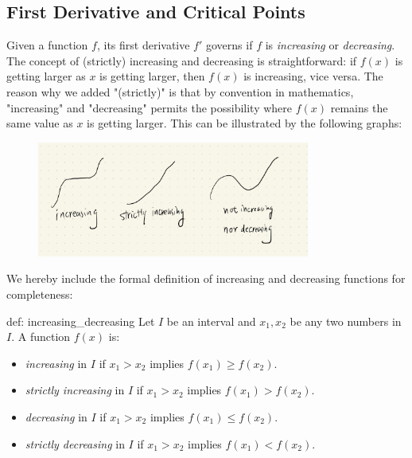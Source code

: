 \subsection{First Derivative and Critical Points}

Given a function $f$, its first derivative $f'$ governs if $f$ is \textit{increasing} or \textit{decreasing}.  The concept of (strictly) increasing and decreasing is straightforward: if $f(x)$ is getting larger as $x$ is getting larger, then $f(x)$ is increasing, vice versa.  The reason why we added "(strictly)" is that by convention in mathematics, "increasing" and "decreasing" permits the possibility where $f(x)$ remains the same value as $x$ is getting larger.  This can be illustrated by the following graphs:

\begin{figure}[ht]
    \centering
    \includegraphics[width = 0.8\textwidth]{figures/chap 05/def_increasing_decreasing.png}
    \label{fig: def_increasing_decreasing}
\end{figure}

We hereby include the formal definition of increasing and decreasing functions for completeness:

\begin{defi}{def: increasing_decreasing}
    Let $I$ be an interval and $x_1, x_2$ be any two numbers in $I$. A function $f(x)$ is:
    \begin{itemize}
        \item \textit{increasing} in $I$ if $x_1 > x_2$ implies $f(x_1) \ge f(x_2)$.
        \item \textit{strictly increasing} in $I$ if $x_1 > x_2$ implies $f(x_1) > f(x_2)$.
        \vspace{0.5cm}
        \item \textit{decreasing} in $I$ if $x_1 > x_2$ implies $f(x_1) \le f(x_2)$.
        \item \textit{strictly decreasing} in $I$ if $x_1 > x_2$ implies $f(x_1) < f(x_2)$.
    \end{itemize}
\end{defi}

